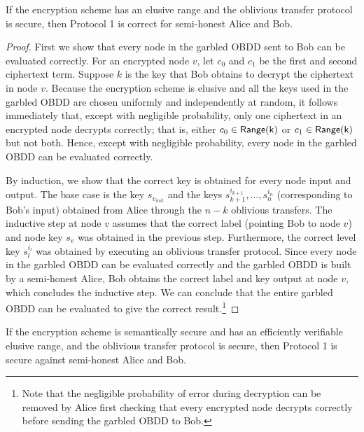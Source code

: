 \begin{claim} If the encryption scheme has an elusive range and the
oblivious transfer protocol is secure, then Protocol 1 is correct for
semi-honest Alice and Bob.
\label{claim:protocol1correct}
\end{claim}
\begin{proof}
First we show that every node in the garbled OBDD sent to Bob can be
evaluated correctly. For an encrypted node $v$, let $c_0$ and $c_1$ be
the first and second ciphertext term. Suppose $k$ is the key that Bob
obtains to decrypt the ciphertext in node $v$. Because the
encryption scheme is elusive and all the keys used in the garbled OBDD
are chosen uniformly and independently at random, it follows
immediately that, except with negligible probability, only one
ciphertext in an encrypted node decrypts correctly; that is,
either $c_0\in\mathsf{Range(k)}$ or $c_1\in\mathsf{Range(k)}$ but not
both. Hence, except with negligible probability, every node in the
garbled OBDD can be evaluated correctly.

By induction, we show that the correct key is obtained for every node
input and output. The base case is the key $s_{v_{init}}$ and the 
keys $s^{i_{k+1}}_{k+1},\ldots,s^{i_{n}}_{n}$ (corresponding to Bob's
input) obtained from Alice through the $n-k$ oblivious transfers. The
inductive step at node $v$ assumes that the correct label (pointing
Bob to node $v$) and node key $s_v$ was obtained in the previous
step. Furthermore, the correct level key $s_l^{i_l}$ was obtained by
executing an oblivious transfer protocol. Since every node in the
garbled OBDD can be evaluated correctly and the garbled OBDD is built by
a semi-honest Alice, Bob obtains the correct label and key output at
node $v$, which concludes the inductive step. We can conclude that the
entire garbled OBDD can be evaluated to give the correct result.\footnote{
Note that the negligible probability of error during
decryption can be removed by Alice first checking that every encrypted
node decrypts correctly before sending the garbled OBDD to Bob.
}
\end{proof}



\begin{claim} If the encryption scheme is semantically secure and has an
efficiently verifiable elusive range, and the oblivious transfer
protocol is secure, then Protocol 1 is secure against semi-honest
Alice and Bob.
\label{claim:protocol1secure}
\end{claim}



